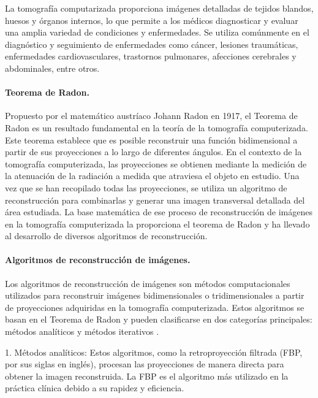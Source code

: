 La tomografía computarizada proporciona imágenes detalladas de tejidos
blandos, huesos y órganos internos, lo que permite a los médicos
diagnosticar y evaluar una amplia variedad de condiciones y
enfermedades. Se utiliza comúnmente en el diagnóstico y seguimiento de
enfermedades como cáncer, lesiones traumáticas, enfermedades
cardiovasculares, trastornos pulmonares, afecciones cerebrales y
abdominales, entre otros.



\paragraph{Teorema de Radon.}
Propuesto por el matemático austríaco Johann Radon en 1917, el Teorema de Radon es un resultado fundamental en la teoría de la tomografía computerizada. Este teorema establece que es posible reconstruir una función bidimensional a partir de sus proyecciones a lo largo de diferentes ángulos. En el contexto de la tomografía computerizada, las proyecciones se obtienen mediante la medición de la atenuación de la radiación a medida que atraviesa el objeto en estudio.
Una vez que se han recopilado todas las proyecciones, se utiliza un algoritmo de reconstrucción para combinarlas y generar una imagen transversal detallada del área estudiada. La base matemática de ese proceso de reconstrucción de imágenes en la tomografía computerizada la proporciona el teorema de Radon y ha llevado al desarrollo de diversos algoritmos de reconstrucción.


\paragraph{Algoritmos de reconstrucción de imágenes.}
Los algoritmos de reconstrucción de imágenes son métodos computacionales utilizados para reconstruir imágenes bidimensionales o tridimensionales a partir de proyecciones adquiridas en la tomografía computerizada. Estos algoritmos se basan en el Teorema de Radon y pueden clasificarse en dos categorías principales: métodos analíticos \cite{kontaxakis2002reconstruccion} y métodos iterativos \cite{Willemink2013}.

1. Métodos analíticos: Estos algoritmos, como la retroproyección filtrada (FBP, por sus siglas en inglés), procesan las proyecciones de manera directa para obtener la imagen reconstruida. La FBP es el algoritmo más utilizado en la práctica clínica debido a su rapidez y eficiencia.

